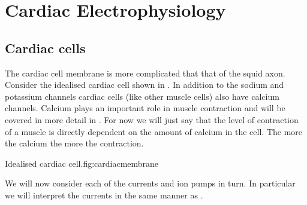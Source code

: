 \chapter{Cardiac Electrophysiology}

\section{Cardiac cells}

The cardiac cell membrane is more complicated that that of the squid axon.
Consider the idealised cardiac cell shown in .  In
addition to the sodium and potassium channels cardiac cells (like other muscle
cells) also have calcium channels. Calcium plays an important role in muscle
contraction and will be covered in more detail in
. For now we will just say that the level of
contraction of a muscle is directly dependent on the amount of calcium in the
cell. The more the calcium the more the contraction.

{Idealised cardiac cell.}{fig:cardiacmembrane}

We will now consider each of the currents and ion pumps in turn. In particular
we will interpret the currents in the same manner as
.

